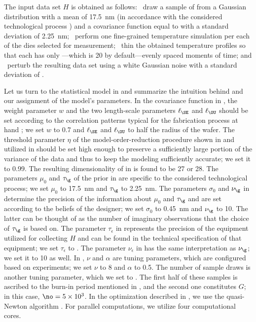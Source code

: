 The input data set $H$ is obtained as follows: \one~draw a sample of \g from a
Gaussian distribution with a mean of 17.5~nm (in accordance with the considered
technological process \cite{ptm}) and a covariance function equal to
 with a standard deviation of 2.25~nm; \two~perform one
fine-grained temperature simulation per each of the \hnd dies selected for
measurement; \three~thin the obtained temperature profiles so that each has only
\ns---which is 20 by default---evenly spaced moments of time; and \four~perturb
the resulting data set using a white Gaussian noise with a standard deviation of
.

Let us turn to the statistical model in  and
summarize the intuition behind and our assignment of the model's parameters. In
the covariance function in , the weight parameter $w$ and
the two length-scale parameters $\ell_\SE$ and $\ell_\OU$ should be set
according to the correlation patterns typical for the fabrication process at
hand \cite{chandrakasan2000, cheng2011}; we set $w$ to 0.7 and $\ell_\SE$ and
$\ell_\OU$ to half the radius of the wafer. The threshold parameter $\eta$ of
the model-order-reduction procedure shown in  and utilized
in  should be set high enough to preserve a sufficiently
large portion of the variance of the data and thus to keep the modeling
sufficiently accurate; we set it to 0.99. The resulting dimensionality \nz of
\vz in  is found to be 27 or 28. The parameters $\mu_0$
and $\tau_\g$ of the prior in  are specific to the considered
technological process; we set $\mu_0$ to 17.5~nm and $\tau_\g$ to 2.25~nm. The
parameters $\sigma_0$ and $\nu_\g$ in  determine the precision
of the information about $\mu_0$ and $\tau_\g$ and are set according to the
beliefs of the designer; we set $\sigma_0$ to 0.45~nm and $\nu_\g$ to 10. The
latter can be thought of as the number of imaginary observations that the choice
of $\tau_\g$ is based on. The parameter $\tau_\epsilon$ in 
represents the precision of the equipment utilized for collecting $H$ and can be
found in the technical specification of that equipment; we set $\tau_\epsilon$
to . The parameter $\nu_\epsilon$ in  has the same
interpretation as $\nu_\g$; we set it to 10 as well. In ,
$\nu$ and $\alpha$ are tuning parameters, which are configured based on
experiments; we set $\nu$ to 8 and $\alpha$ to 0.5. The number of sample draws
is another tuning parameter, which we set to . The first half of
these samples is ascribed to the burn-in period mentioned in
, and the second one constitutes $G$; in this case,
$\no = 5 \times 10^3$. In the optimization described in
, we use the quasi-Newton algorithm \cite{press2007}.
For parallel computations, we utilize four computational cores.

